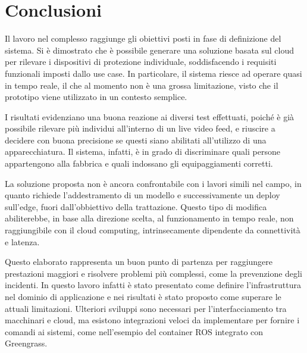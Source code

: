 \chapter*{Conclusioni}

Il lavoro nel complesso raggiunge gli obiettivi posti in fase di definizione del sistema. Si è dimostrato che è possibile generare una soluzione basata sul cloud per rilevare i dispositivi di protezione individuale, soddisfacendo i requisiti funzionali imposti dallo use case. In particolare, il sistema riesce ad operare quasi in tempo reale, il che al momento non è una grossa limitazione, visto che il prototipo viene utilizzato in un contesto semplice.

\vspace{0.3cm}
\noindent I risultati evidenziano una buona reazione ai diversi test effettuati, poiché è già possibile rilevare più individui all'interno di un live video feed, e riuscire a decidere con buona precisione se questi siano abilitati all'utilizzo di una apparecchiatura. Il sistema, infatti, è in grado di discriminare quali persone appartengono alla fabbrica e quali indossano gli equipaggiamenti corretti.

\vspace{0.3cm}
\noindent La soluzione proposta non è ancora confrontabile con i lavori simili nel campo, in quanto richiede l'addestramento di un modello e successivamente un deploy sull'edge, fuori dall'obbiettivo della trattazione. Questo tipo di modifica abiliterebbe, in base alla direzione scelta, al funzionamento in tempo reale, non raggiungibile con il cloud computing, intrinsecamente dipendente da connettività e latenza. 

\vspace{0.3cm}
\noindent Questo elaborato rappresenta un buon punto di partenza per raggiungere prestazioni maggiori e risolvere problemi più complessi, come la prevenzione degli incidenti. In questo lavoro infatti è stato presentato come definire l'infrastruttura nel dominio di applicazione e nei risultati è stato proposto come superare le attuali limitazioni.  %
Ulteriori sviluppi sono necessari per l'interfacciamento tra macchinari e cloud, ma esistono integrazioni veloci da implementare per fornire i comandi ai sistemi, come nell'esempio del container ROS integrato con Greengrass. 